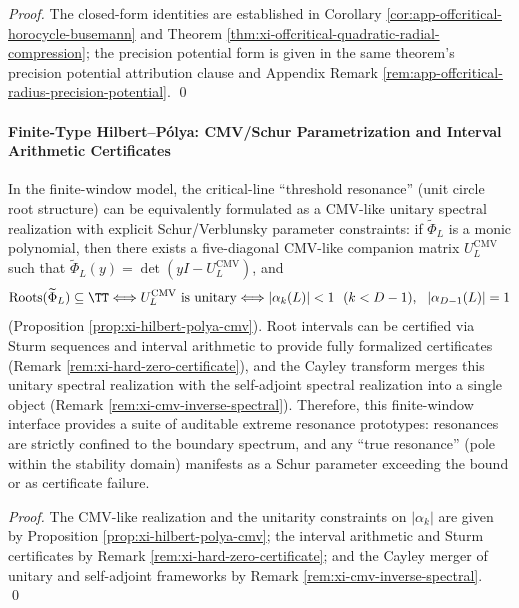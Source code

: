 \begin{proof}
The closed-form identities are established in Corollary \ref{cor:app-offcritical-horocycle-busemann} and Theorem \ref{thm:xi-offcritical-quadratic-radial-compression};
the precision potential form is given in the same theorem's precision potential attribution clause and Appendix Remark \ref{rem:app-offcritical-radius-precision-potential}. \qed
\end{proof}

\paragraph{Finite-Type Hilbert--P{\'o}lya: CMV/Schur Parametrization and Interval Arithmetic Certificates}
\begin{theorem}\label{thm:xi-finite-window-extreme-resonance-certificate}
In the finite-window model, the critical-line ``threshold resonance'' (unit circle root structure) can be equivalently formulated as a CMV-like unitary spectral realization with explicit Schur/Verblunsky parameter constraints:
if \(\widetilde\Phi_L\) is a monic polynomial, then there exists a five-diagonal CMV-like companion matrix \(U_L^{\mathrm{CMV}}\) such that
\(\widetilde\Phi_L(y)=\det(yI-U_L^{\mathrm{CMV}})\), and
\[
\mathrm{Roots}(\widetilde\Phi_L)\subseteq\TT
\Longleftrightarrow
U_L^{\mathrm{CMV}}\ \text{is unitary}
\Longleftrightarrow
|\alpha_k(L)|<1\ \ (k< D-1),\ \ |\alpha_{D-1}(L)|=1
\]
(Proposition \ref{prop:xi-hilbert-polya-cmv}).
Root intervals can be certified via Sturm sequences and interval arithmetic to provide fully formalized certificates (Remark \ref{rem:xi-hard-zero-certificate}), and the Cayley transform merges this unitary spectral realization with the self-adjoint spectral realization into a single object (Remark \ref{rem:xi-cmv-inverse-spectral}).
Therefore, this finite-window interface provides a suite of auditable extreme resonance prototypes: resonances are strictly confined to the boundary spectrum, and any ``true resonance'' (pole within the stability domain) manifests as a Schur parameter exceeding the bound or as certificate failure.
\end{theorem}

\begin{proof}
The CMV-like realization and the unitarity constraints on \(|\alpha_k|\) are given by Proposition \ref{prop:xi-hilbert-polya-cmv}; the interval arithmetic and Sturm certificates by Remark \ref{rem:xi-hard-zero-certificate}; and the Cayley merger of unitary and self-adjoint frameworks by Remark \ref{rem:xi-cmv-inverse-spectral}. \qed
\end{proof}

